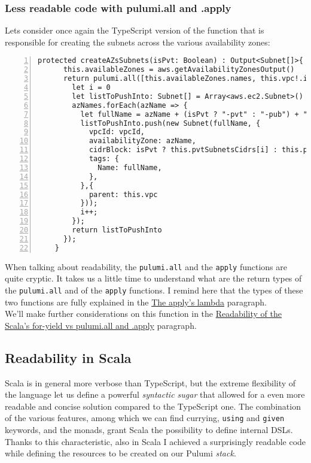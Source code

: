 \subsubsection{Less readable code with pulumi.all and .apply}
\label{sssec:ts-subnets-comparison}
Lets consider once again the TypeScript version of the function that is responsible for creating the subnets across the various availability zones:\\
\begin{minipage}{\linewidth}
  \begin{lstlisting}[numbers=left, numberstyle=\tiny, numbersep=-5pt, stepnumber=1, linewidth=420pt]
    protected createAZsSubnets(isPvt: Boolean) : Output<Subnet[]>{
      this.availableZones = aws.getAvailabilityZonesOutput()
      return pulumi.all([this.availableZones.names, this.vpc!.id]).apply(([azNames, vpcId]) => {
        let i = 0
        let listToPushInto: Subnet[] = Array<aws.ec2.Subnet>()
        azNames.forEach(azName => {
          let fullName = azName + (isPvt ? "-pvt" : "-pub") + "-subnet-typescript"
          listToPushInto.push(new Subnet(fullName, {
            vpcId: vpcId,
            availabilityZone: azName,
            cidrBlock: isPvt ? this.pvtSubnetsCidrs[i] : this.pubSubnetsCidrs[i],
            tags: {
              Name: fullName,
            },
          },{
            parent: this.vpc
          }));
          i++;
        });
        return listToPushInto
      });
    }
  \end{lstlisting}
  \end{minipage}
When talking about readability, the \texttt{pulumi.all} and the \texttt{apply} functions are quite cryptic.
It takes us a little time to understand what are the return types of the \texttt{pulumi.all} and of the \texttt{apply} functions.
I remind here that the types of these two functions are fully explained in the \hyperref[par:ts-lambda]{The apply's lambda} paragraph.\\
We'll make further considerations on this function in the \hyperref[sssec:readability-for-yield]{Readability of the Scala's for-yield vs pulumi.all and .apply} paragraph.

\subsection{Readability in Scala}
Scala is in general more verbose than TypeScript, but the extreme flexibility of the language let us define a powerful \textit{syntactic sugar} that allowed for a even more readable and concise solution compared to the TypeScript one.
The combination of the various features, among which we can find currying, \texttt{using} and \texttt{given} keywords, and the monads, grant Scala the possibility to define \gls{internal DSL}s.
Thanks to this characteristic, also in Scala I achieved a surprisingly readable code while defining the resources to be created on our Pulumi \textit{stack}.

